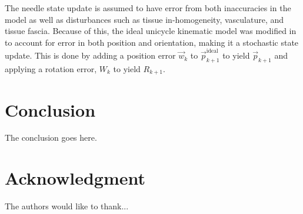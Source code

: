 \documentclass[journal,transmag]{IEEEtran}
\begin{document}
The needle state update is assumed to have error from both inaccuracies in the model as well as disturbances such as tissue in-homogeneity, vasculature, and tissue fascia.  Because of this, the ideal unicycle kinematic model was modified in \cite{adebar2014recursive} to account for error in both position and orientation, making it a stochastic state update.  This is done by adding a position error $\vec{w}_k$ to $\vec{p}^{\text{ideal}}_{k+1}$ to yield $\vec{p}_{k+1}$ and applying a rotation error, $W_k$ to yield $R_{k+1}$.  
 
\section{Conclusion}
The conclusion goes here.


\section*{Acknowledgment}
The authors would like to thank...




%
%
%
 


% 
\end{document}
